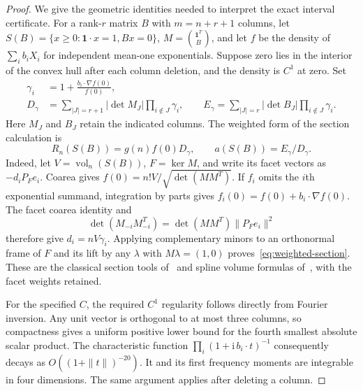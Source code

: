 \documentclass[11pt]{article}
\DeclareMathOperator{\vol}{vol}
\begin{document}
\begin{proof}
We give the geometric identities needed to interpret the exact interval
certificate. For a rank-$r$ matrix $B$ with $m=n+r+1$ columns, let
$S(B)=\{x\ge0:\boldsymbol1\cdot x=1,Bx=0\}$, $M=\binom{\boldsymbol1^T}{B}$,
and let $f$ be the density of $\sum_i b_iX_i$ for independent mean-one
exponentials. Suppose zero lies in the interior of the convex hull
after each column deletion, and the density is $C^1$ at zero. Set
\begin{align*}
 \gamma_i&=1+\frac{b_i\cdot\nabla f(0)}{f(0)},\\
 D_\gamma&=\sum_{|J|=r+1}|\det M_J|\prod_{i\notin J}\gamma_i,\qquad
 E_\gamma=\sum_{|J|=r}|\det B_J|\prod_{i\notin J}\gamma_i.
\end{align*}
Here $M_J$ and $B_J$ retain the indicated columns. The weighted form of
the section calculation is
\begin{equation}\label{eq:weighted-section}
 R_n(S(B))=g(n)f(0)D_\gamma,\qquad a(S(B))=E_\gamma/D_\gamma.
\end{equation}
Indeed, let $V=\vol_n(S(B))$, $F=\ker M$, and write its facet vectors
as $-d_iP_Fe_i$. Coarea gives $f(0)=n!V/\sqrt{\det(MM^T)}$.
If $f_i$ omits the $i$th exponential summand, integration by parts gives
$f_i(0)=f(0)+b_i\cdot\nabla f(0)$. The facet coarea identity and
\[
 \det(M_{-i}M_{-i}^T)=\det(MM^T)\|P_Fe_i\|^2
\]
therefore give $d_i=nV\gamma_i$. Applying complementary minors to an
orthonormal frame of $F$ and its lift by any $\lambda$ with
$M\lambda=(1,0)$ proves~\eqref{eq:weighted-section}.
These are the classical section tools of~\cite[Section 4]{feng} and
spline volume formulas of~\cite[Section 3]{xu}, with the facet weights retained.

For the specified $C$, the required $C^1$ regularity follows directly
from Fourier inversion. Any unit vector is orthogonal to at most three
columns, so compactness gives a uniform positive lower bound for the
fourth smallest absolute scalar product. The characteristic function
$\prod_i(1+\mathrm i\,b_i\cdot t)^{-1}$ consequently decays as
$O((1+\|t\|)^{-20})$. It and its first frequency moments are integrable
in four dimensions. The same argument applies after deleting a column.


\end{proof}
\end{document}
